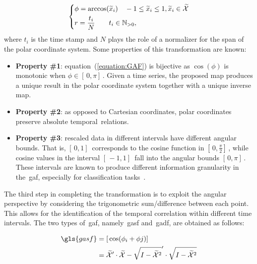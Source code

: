 \begin{equation}
\begin{dcases}
  \phi = \arccos(\widetilde{x}_{i}) \quad -1 \leq \widetilde{x}_{i} \leq 1, \widetilde{x}_{i} \in \widetilde{\mathcal{X}} \\
  r = \frac{t_{i}}{N} \quad \quad t_{i} \in \mathbb{N}_{>0},
\end{dcases}
\label{equation:GAF}
\end{equation} 
where $t_{i}$ is the time stamp and $N$ plays the role of a normalizer for the span of the polar coordinate system. Some properties of this transformation are known:

\begin{itemize}[leftmargin=*,labelsep=5.8mm]
\item \textbf{{Property \#1}}: equation~(\ref{equation:GAF}) is bijective as $\cos(\phi)$ is monotonic when $\phi \in [\,0,\pi]\,$. Given a time series, the proposed map produces a unique result in the polar coordinate system together with a unique inverse map. 
\item \textbf{{Property \#2}}: as opposed to Cartesian coordinates, polar coordinates preserve absolute temporal~relations.
\item \textbf{{Property \#3}}: rescaled data in different intervals have different angular bounds. That is, $[\,0,1]\,$ corresponds to the cosine function in $[\,0,\frac{\pi}{2}]\,$, while cosine values in the interval $[\,-1,1]\,$ fall into the angular bounds $[\,0,\pi]\,$. These intervals are known to produce different information granularity in the~\gls{gaf}, especially for classification tasks~\citep{wang_imaging_2015}.
\end{itemize}

The third step in completing the transformation is to exploit the angular perspective by considering the trigonometric sum/difference between each point. This allows for the identification of the temporal correlation within different time intervals. The two types of~\gls{gaf}, namely~\gls{gasf} and~\gls{gadf}, are obtained as follows:

\begin{equation}
    \begin{aligned}
    \gls{gasf} &= [\,\cos(\phi_{i} + \phi{j})]\, \\
    	 &= \widetilde{\mathcal{X}}' \cdot \widetilde{\mathcal{X}} - \sqrt{I-\widetilde{\mathcal{X}}^2}' \cdot \sqrt{I-\widetilde{\mathcal{X}}^2}
    \end{aligned}
\end{equation}

